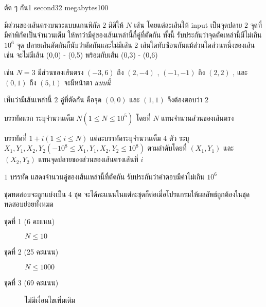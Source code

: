 \documentclass[11pt,a4paper]{article}
\begin{document}
 
\begin{problem}{ตัด ๆ กัน}{}{}{1 second}{32 megabytes}{100}
 
มีส่วนของเส้นตรงบนระแบบแกนพิกัด $2$ มิติให้ $N$ เส้น โดยแต่ละเส้นให้ input เป็นจุดปลาย $2$ จุดที่มีค่าพิกัดเป็นจำนวนเต็ม ให้หาว่ามีคู่ของเส้นเหล่านี้กี่คู่ที่ตัดกัน ทั้งนี้ รับประกันว่าจุดตัดเหล่านี้มีไม่เกิน $10^6$ จุด ปลายเส้นตัดกันก็นับว่าตัดกันและไม่มีเส้น 2 เส้นใดทับซ้อนกันแม้ส่วนใดส่วนหนึ่งของเส้น เช่น จะไม่มีเส้น (0,0) - (0,5) พร้อมกับเส้น (0,3) - (0,6)

เช่น $N = 3$ มีส่วนของเส้นตรง $(-3,6)$ ถึง $(2,-4)$ , $(-1,-1)$ ถึง $(2,2)$ , และ $(0,1)$ ถึง $(5,1)$ จะมีหน้าตา \textit{แบบนี้}


เห็นว่ามีเส้นเหล่านี้ $2$ คู่ที่ตัดกัน คือจุด $(0,0)$ และ $(1,1)$ จึงต้องตอบว่า $2$

\InputFile

บรรทัดแรก ระบุจำนวนเต็ม $N (1 \leq N \leq 10^5)$ โดยที่ $N$ แทนจำนวนส่วนของเส้นตรง

บรรทัดที่ $1+i (1 \leq i \leq N)$ แต่ละบรรทัดระบุจำนวนเต็ม $4$ ตัว ระบุ $X_1, Y_1, X_2, Y_2 (-10^8 \leq X_1, Y_1, X_2, Y_2 \leq 10^8)$ ตามลำดับโดยที่ $(X_1,Y_1)$ และ $(X_2,Y_2)$ แทนจุดปลายของส่วนของเส้นตรงเส้นที่ $i$

\OutputFile

$1$ บรรทัด แสดงจำนวนคู่ของเส้นเหล่านี้ที่ตัดกัน รับประกันว่าคำตอบมีค่าไม่เกิน $10^6$


 
\Scoring
ชุดทดสอบจะถูกแบ่งเป็น 4 ชุด จะได้คะแนนในแต่ละชุดก็ต่อเมื่อโปรแกรมให้ผลลัพธ์ถูกต้องในชุดทดสอบย่อยทั้งหมด
 
\begin{description}
\item[ชุดที่ 1 (6 คะแนน)] $N \leq 10$
\item[ชุดที่ 2 (25 คะแนน)] $N \leq 1000$
\item[ชุดที่ 3 (69 คะแนน)] ไม่มีเงื่อนไขเพิ่มเติม
\end{description}

\Examples

\begin{example}
%
\end{example}
 
\end{problem}
 
\end{document}
